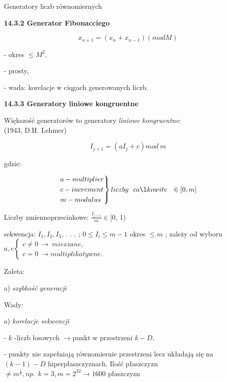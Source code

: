     \begin{frame}{Generatory liczb równomiernych}

	\textbf{14.3.2 Generator Fibonacciego}
	\begin{center}
 	$$x_{n+1} = (x_{n} + x_{n-1})(mod M)$$
	\end{center}
	- okres $\leq M^{2},$

	- prosty,

	- wada: korelacje w ciqgach generowanych liczb.
    \newline
	\end{frame}
    \begin{frame}
	\textbf{14.3.3 Generatory liniowe kongruentne}

	Większość generatorów to generatory {\it liniowe kongruentne}:\\ (1943, D.H. Lehmer)
	\begin{center}
 	$$I_{j+1} = (aI_{j}+c) mod\ m$$
	\end{center}
	gdzie:

    \[
    {\begin{rcases*}
	a - multiplier\\
	c - increment\\
	m - modulus
    \end{rcases*} liczby\ \ całkowite \ \ \in [0,m]}
    \]
	\end{frame}
    \begin{frame}
	Liczby zmiennoprzecinkowe: $\displaystyle \frac{I_{j+1}}{m}\in[0$, 1)
    \newline

	sekwencja: $I_{1}, I_{2}, I_{3}$, . . . ; $0\leq I_{i}\leq m-1$
    \newline \newline
    okres $\leq m$ ; zależy od wyboru $a, c \left\{\begin{array}{l}
	c\neq 0\ \rightarrow\ mieszane,\\
	c=0\ \rightarrow multiplikatywne.
	\end{array}\right.$

	Zaleta:

	a) {\it szybkość generacji}
	\newline

	Wady:

	a) {\it korelacje sekwencji}

	- $k$ -liczb losowych $\rightarrow$punkt w przestrzeni $k-D,$

	- punkty nie zapełniają równomiernie przestrzeni lecz układają się na $(k-1)-D$ 				hiperpłaszczyznach. Ilość płaszczyzn $\neq m^{\frac{1}{k}}, np. \ \ k=3, m=2^{32}\rightarrow 1600$ 		płaszczyzn

    \end{frame}
